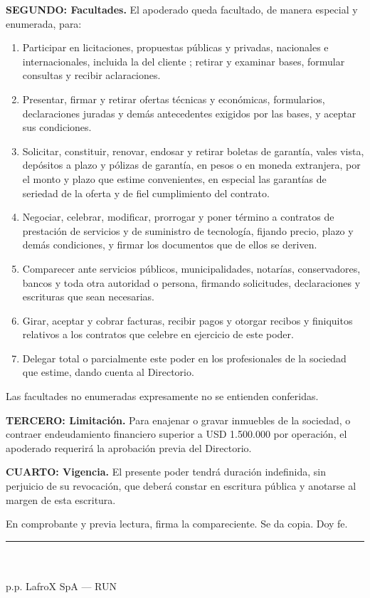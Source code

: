 \documentclass[11pt]{article}
\newcommand{\clau}[2]{\par\needspace{4\baselineskip}\textbf{#1.} #2\par}
\begin{document}
\clau{SEGUNDO: Facultades}{El apoderado queda facultado, de manera especial y enumerada, para:}
\begin{enumerate}[label=\arabic*)]
  \item Participar en licitaciones, propuestas públicas y privadas, nacionales e internacionales, incluida la \LFXlicitacion{} del cliente \LFXcliente; retirar y examinar bases, formular consultas y recibir aclaraciones.
  \item Presentar, firmar y retirar ofertas técnicas y económicas, formularios, declaraciones juradas y demás antecedentes exigidos por las bases, y aceptar sus condiciones.
  \item Solicitar, constituir, renovar, endosar y retirar boletas de garantía, vales vista, depósitos a plazo y pólizas de garantía, en pesos o en moneda extranjera, por el monto y plazo que estime convenientes, en especial las garantías de seriedad de la oferta y de fiel cumplimiento del contrato.
  \item Negociar, celebrar, modificar, prorrogar y poner término a contratos de prestación de servicios y de suministro de tecnología, fijando precio, plazo y demás condiciones, y firmar los documentos que de ellos se deriven.
  \item Comparecer ante servicios públicos, municipalidades, notarías, conservadores, bancos y toda otra autoridad o persona, firmando solicitudes, declaraciones y escrituras que sean necesarias.
  \item Girar, aceptar y cobrar facturas, recibir pagos y otorgar recibos y finiquitos relativos a los contratos que celebre en ejercicio de este poder.
  \item Delegar total o parcialmente este poder en los profesionales de la sociedad que estime, dando cuenta al Directorio.
\end{enumerate}
Las facultades no enumeradas expresamente no se entienden conferidas.

\clau{TERCERO: Limitación}{Para enajenar o gravar inmuebles de la sociedad, o contraer endeudamiento financiero superior a USD 1.500.000 por operación, el apoderado requerirá la aprobación previa del Directorio.}
\clau{CUARTO: Vigencia}{El presente poder tendrá duración indefinida, sin perjuicio de su revocación, que deberá constar en escritura pública y anotarse al margen de esta escritura.}

En comprobante y previa lectura, firma la compareciente. Se da copia. Doy fe.

\vspace{14pt}
\begin{center}\rule{6cm}{0.4pt}\\\SIMpresidenta\\ p.p. LafroX SpA --- RUN \SIMpresidentarun\end{center}
\end{document}
